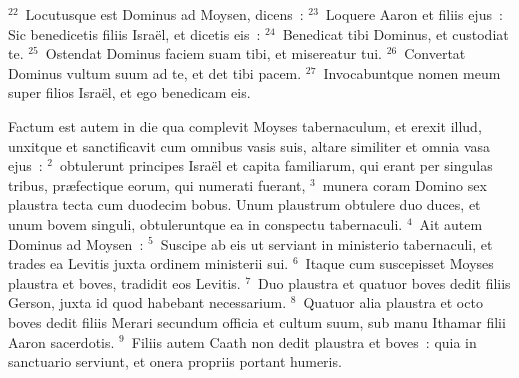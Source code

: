 ${}^{22}$~Locutusque est Dominus ad Moysen, dicens~:
${}^{23}$~Loquere Aaron et filiis ejus~: Sic benedicetis filiis Isra\"el, et dicetis eis~:
${}^{24}$~Benedicat tibi Dominus, et custodiat te.
${}^{25}$~Ostendat Dominus faciem suam tibi, et misereatur tui.
${}^{26}$~Convertat Dominus vultum suum ad te, et det tibi pacem.
${}^{27}$~Invocabuntque nomen meum super filios Isra\"el, et ego benedicam eis.

\lettrine[lines=3,image=true,loversize=0.05,lraise=-0.03]{F}{}actum est autem in die qua complevit Moyses tabernaculum, et erexit illud, unxitque et sanctificavit cum omnibus vasis suis, altare similiter et omnia vasa ejus~:
${}^{2}$~obtulerunt principes Isra\"el et capita familiarum, qui erant per singulas tribus, pr\ae fectique eorum, qui numerati fuerant,
${}^{3}$~munera coram Domino sex plaustra tecta cum duodecim bobus. Unum plaustrum obtulere duo duces, et unum bovem singuli, obtuleruntque ea in conspectu tabernaculi.
${}^{4}$~Ait autem Dominus ad Moysen~:
${}^{5}$~Suscipe ab eis ut serviant in ministerio tabernaculi, et trades ea Levitis juxta ordinem ministerii sui.
${}^{6}$~Itaque cum suscepisset Moyses plaustra et boves, tradidit eos Levitis.
${}^{7}$~Duo plaustra et quatuor boves dedit filiis Gerson, juxta id quod habebant necessarium.
${}^{8}$~Quatuor alia plaustra et octo boves dedit filiis Merari secundum officia et cultum suum, sub manu Ithamar filii Aaron sacerdotis.
${}^{9}$~Filiis autem Caath non dedit plaustra et boves~: quia in sanctuario serviunt, et onera propriis portant humeris.


